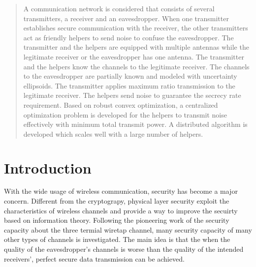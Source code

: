 \documentclass[12pt,journal,draftclsnofoot,onecolumn]{IEEEtran}
\begin{document}




\maketitle

\begin{abstract}
A communication network is considered that consists of several transmitters, a receiver and an eavesdropper.  When one transmitter establishes secure communication with the receiver, the other transmitters act as friendly helpers to send noise to confuse the eavesdropper.  The transmitter and the helpers are equipped with multiple antennas while the legitimate receiver or the eavesdropper has one antenna.  The transmitter and the helpers know the channels to the legitimate receiver. The channels to the eavesdropper are partially known and modeled with uncertainty ellipsoids.  The transmitter applies maximum ratio transmission to the legitimate receiver.  The helpers send noise to guarantee the secrecy rate requirement.  Based on robust convex optimization, a centralized optimization problem is developed for the helpers to transmit noise effectively with minimum total transmit power.  A distributed algorithm is developed which scales well with a large number of helpers. 
\end{abstract}





%
\IEEEpeerreviewmaketitle



\section{Introduction}
With the wide usage of wireless communication, security has become a major concern. Different from the cryptograpy, physical layer security exploit the characteristics of wireless channels and provide a way to improve the secuirty based on information theory. Following the pioneering work of the security capacity about the three termial wiretap channel, many security capacity of many other types of channels is investigated. The main idea is that the when the quality of the eavesdropper's channels is worse than the quality of the intended receivers', perfect secure data transmission can be achieved.
\end{document}
